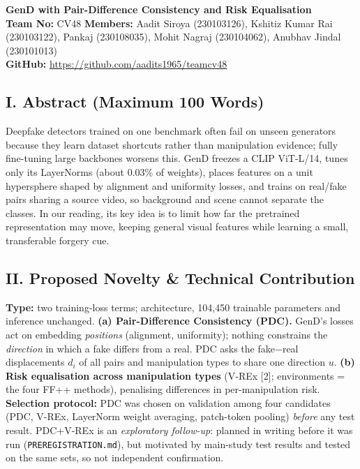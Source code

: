 \documentclass[8pt,a4paper]{article}
\begin{document}
\thispagestyle{empty}

\begin{center}

{\large\bfseries
GenD with Pair-Difference Consistency and Risk Equalisation}\\[4pt]

\textbf{Team No:} CV48
\quad \textbar{} \quad
\textbf{Members:}
Aadit Siroya (230103126), Kshitiz Kumar Rai (230103122), Pankaj (230108035), Mohit Nagraj (230104062), Anubhav Jindal (230101013)\\[3pt]

\textbf{GitHub:}
\url{https://github.com/aadits1965/teamcv48}

\end{center}

\vspace{-5pt}

\subsection*{I. Abstract (Maximum 100 Words)}
Deepfake detectors trained on one benchmark often fail on unseen generators because they learn dataset shortcuts rather than manipulation evidence; fully fine-tuning large backbones worsens this. GenD freezes a CLIP ViT-L/14, tunes only its LayerNorms (about 0.03\% of weights), places features on a unit hypersphere shaped by alignment and uniformity losses, and trains on real/fake pairs sharing a source video, so background and scene cannot separate the classes. In our reading, its key idea is to limit how far the pretrained representation may move, keeping general visual features while learning a small, transferable forgery cue.

\subsection*{II. Proposed Novelty \& Technical Contribution}
\textbf{Type:} two training-loss terms; architecture, 104,450 trainable parameters and inference unchanged.
\textbf{(a) Pair-Difference Consistency (PDC).} GenD's losses act on embedding \emph{positions} (alignment, uniformity); nothing constrains the \emph{direction} in which a fake differs from a real. PDC asks the fake$-$real displacements $d_i$ of all pairs and manipulation types to share one direction $u$.
\textbf{(b) Risk equalisation across manipulation types} (V-REx [2]; environments = the four FF++ methods), penalising differences in per-manipulation risk.
\textbf{Selection protocol:} PDC was chosen on validation among four candidates (PDC, V-REx, LayerNorm weight averaging, patch-token pooling) \emph{before} any test result. PDC+V-REx is an \emph{exploratory follow-up}: planned in writing before it was run (\texttt{PREREGISTRATION.md}), but motivated by main-study test results and tested on the same sets, so not independent confirmation.
\end{document}

